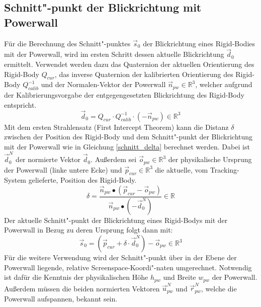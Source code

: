 \documentclass[]{article}
\newcommand{\POW}{Powerwall}
\begin{document}
\subsection{Schnitt"-punkt der Blickrichtung mit \POW{}}
Für die Berechnung des Schnitt"-punktes  $\overrightarrow{s}_{0}$ der Blickrichtung eines Rigid-Bodies mit der \POW{}, wird im ersten Schritt dessen aktuelle Blickrichtung $\overrightarrow{d}_{0}$ ermittelt. Verwendet werden dazu das Quaternion der aktuellen Orientierung des Rigid-Body $Q_{cur}$, das inverse Quaternion der kalibrierten Orientierung des Rigid-Body $Q^{-1}_{calib}$ und der Normalen-Vektor der \POW{} $\overrightarrow{n}_{pw} \in \mathbb{R}^{3}$, welcher aufgrund der Kalibrierungsvorgabe der entgegengesetzten Blickrichtung des Rigid-Body entspricht.
\begin{equation} 
    \overrightarrow{d}_{0} = Q_{cur} \cdot Q^{-1}_{calib} \cdot (-\overrightarrow{n}_{pw}) \in \mathbb{R}^{3}
\end{equation}
Mit dem ersten Strahlensatz (First Intercept Theorem) kann die Distanz $\delta$ zwischen der Position des Rigid-Body und dem Schnitt"-punkt der Blickrichtung mit der \POW{} wie in Gleichung \ref{schnitt_delta} berechnet werden. Dabei ist $\overrightarrow{d}^{N}_{0}$ der normierte Vektor $\overrightarrow{d}_{0}$. Außerdem sei $\overrightarrow{o}_{pw} \in \mathbb{R}^{3}$ der physikalische Ursprung  der \POW{} (linke untere Ecke) und $\overrightarrow{p}_{cur} \in \mathbb{R}^{3}$ die aktuelle, vom Tracking-System gelieferte, Position des Rigid-Body.
\begin{equation} \label{schnitt_delta} 
\delta = \frac{\overrightarrow{n}_{pw} \bullet (\overrightarrow{p}_{cur} - \overrightarrow{o}_{pw}) } 
              {\overrightarrow{n}_{pw} \bullet (-\overrightarrow{d}^{N}_{0}) } \in \mathbb{R}
\end{equation}
Der aktuelle Schnitt"-punkt der Blickrichtung eines Rigid-Bodys mit der \POW{} in Bezug zu deren Ursprung folgt dann mit:
\begin{equation} 
    \overrightarrow{s}_{0} = (\overrightarrow{p}_{cur} + \delta \cdot \overrightarrow{d}^{N}_{0}) - \overrightarrow{o}_{pw} \in \mathbb{R}^{3} 
\end{equation}
Für die weitere Verwendung wird der Schnitt"-punkt über in der Ebene der \POW{} liegende, relative \glqq{}Screenspace\grqq{}-Koordi"-naten umgerechnet. 
Notwendig ist dafür die Kenntnis der physikalischen Höhe $h_{pw}$ und Breite $w_{pw}$ der \POW{}. Außerdem müssen die beiden normierten Vektoren $\overrightarrow{u}_{pw}^{N}$ und $\overrightarrow{r}_{pw}^{N}$, welche die \POW{} aufspannen, bekannt sein. 
\end{document}
